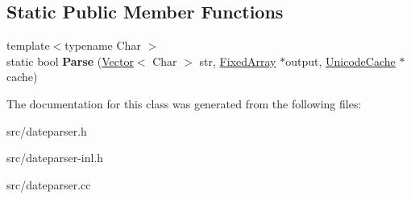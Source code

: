 \subsection*{Static Public Member Functions}
\begin{DoxyCompactItemize}
\item 
\hypertarget{classv8_1_1internal_1_1_date_parser_a326f56b8caa5cffeec10711b1d354e11}{}{\footnotesize template$<$typename Char $>$ }\\static bool {\bfseries Parse} (\hyperlink{classv8_1_1internal_1_1_vector}{Vector}$<$ Char $>$ str, \hyperlink{classv8_1_1internal_1_1_fixed_array}{Fixed\+Array} $\ast$output, \hyperlink{classv8_1_1internal_1_1_unicode_cache}{Unicode\+Cache} $\ast$cache)\label{classv8_1_1internal_1_1_date_parser_a326f56b8caa5cffeec10711b1d354e11}

\end{DoxyCompactItemize}


The documentation for this class was generated from the following files\+:\begin{DoxyCompactItemize}
\item 
src/dateparser.\+h\item 
src/dateparser-\/inl.\+h\item 
src/dateparser.\+cc\end{DoxyCompactItemize}
